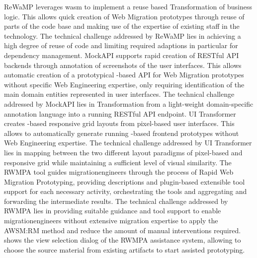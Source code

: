 ReWaMP leverages \gls{wasm} to implement a reuse based \gls{Transformation} of  business logic.
This allows quick creation of \gls{Web Migration} prototypes through reuse of parts of the  code base and making use of the expertise of existing staff in the  technology.
The technical challenge addressed by ReWaMP lies in achieving a high degree of reuse of   code and limiting required adaptions in particular for dependency management.
MockAPI supports rapid creation of RESTful API backends through annotation of screenshots of the  user interfaces.
This allows automatic creation of a prototypical -based API for \gls{Web Migration} prototypes without specific \gls{Web Engineering} expertise, only requiring identification of the main domain entities represented in  user interfaces.
The technical challenge addressed by MockAPI lies in \gls{Transformation} from a light-weight domain-specific annotation language into a running RESTful API endpoint.
UI Transformer creates -based responsive grid layouts from pixel-based  user interfaces.
This allows to automatically generate running -based frontend prototypes without \gls{Web Engineering} expertise.
The technical challenge addressed by UI Transformer lies in mapping between the two different layout paradigms of pixel-based and responsive grid while maintaining a sufficient level of visual similarity.
The RWMPA tool guides \glspl{migrationengineer} through the process of \gls{Rapid Web Migration Prototyping}, providing descriptions and plugin-based extensible tool support for each necessary activity, orchestrating the tools and aggregating and forwarding the intermediate results.
The technical challenge addressed by RWMPA lies in providing suitable guidance and tool support to enable \glspl{migrationengineer} without extensive migration expertise to apply the AWSM:RM method and reduce the amount of manual interventions required.
 shows the view selection dialog of the RWMPA assistance system, allowing to choose the source material from existing \legacy \glspl{artifact} to start assisted prototyping. 

